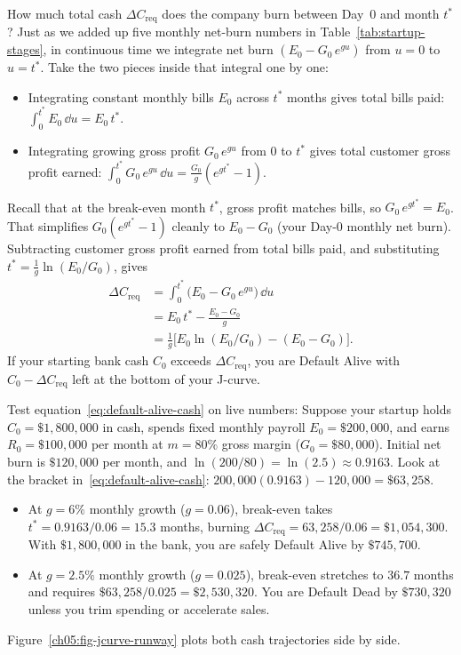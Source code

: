 How much total cash $\Delta C_{\text{req}}$ does the company burn between Day~0 and month $t^*$? Just as we added up five monthly net-burn numbers in Table~\ref{tab:startup-stages}, in continuous time we integrate net burn $(E_0 - G_0\,e^{g u})$ from $u = 0$ to $u = t^*$. Take the two pieces inside that integral one by one:
\begin{itemize}
  \item Integrating constant monthly bills $E_0$ across $t^*$ months gives total bills paid: $\int_0^{t^*} E_0\,\dd u = E_0\,t^*$.
  \item Integrating growing gross profit $G_0\,e^{g u}$ from $0$ to $t^*$ gives total customer gross profit earned: $\int_0^{t^*} G_0\,e^{g u}\,\dd u = \frac{G_0}{g}(e^{g t^*} - 1)$.
\end{itemize}
Recall that at the break-even month $t^*$, gross profit matches bills, so $G_0\,e^{g t^*} = E_0$. That simplifies $G_0(e^{g t^*} - 1)$ cleanly to $E_0 - G_0$ (your Day-0 monthly net burn). Subtracting customer gross profit earned from total bills paid, and substituting $t^* = \frac{1}{g}\ln(E_0 / G_0)$, gives
\begin{equation}\label{eq:default-alive-cash}
\begin{split}
  \Delta C_{\text{req}} &= \int_0^{t^*} \bigl(E_0 - G_0\,e^{g u}\bigr)\,\dd u \\
  &= E_0\,t^* - \frac{E_0 - G_0}{g} \\
  &= \frac{1}{g}\bigl[E_0\ln(E_0 / G_0) - (E_0 - G_0)\bigr].
\end{split}
\end{equation}
If your starting bank cash $C_0$ exceeds $\Delta C_{\text{req}}$, you are Default Alive with $C_0 - \Delta C_{\text{req}}$ left at the bottom of your J-curve.

Test equation~\eqref{eq:default-alive-cash} on live numbers: Suppose your startup holds $C_0 = \$1{,}800{,}000$ in cash, spends fixed monthly payroll $E_0 = \$200{,}000$, and earns $R_0 = \$100{,}000$ per month at $m = 80\%$ gross margin ($G_0 = \$80{,}000$). Initial net burn is $\$120{,}000$ per month, and $\ln(200/80) = \ln(2.5) \approx 0.9163$. Look at the bracket in~\eqref{eq:default-alive-cash}: $200{,}000(0.9163) - 120{,}000 = \$63{,}258$.
\begin{itemize}
  \item At $g = 6\%$ monthly growth ($g = 0.06$), break-even takes $t^* = 0.9163 / 0.06 = 15.3$ months, burning $\Delta C_{\text{req}} = 63{,}258 / 0.06 = \$1{,}054{,}300$. With $\$1{,}800{,}000$ in the bank, you are safely Default Alive by $\$745{,}700$.
  \item At $g = 2.5\%$ monthly growth ($g = 0.025$), break-even stretches to $36.7$ months and requires $\$63{,}258 / 0.025 = \$2{,}530{,}320$. You are Default Dead by $\$730{,}320$ unless you trim spending or accelerate sales.
\end{itemize}
Figure~\ref{ch05:fig-jcurve-runway} plots both cash trajectories side by side.

